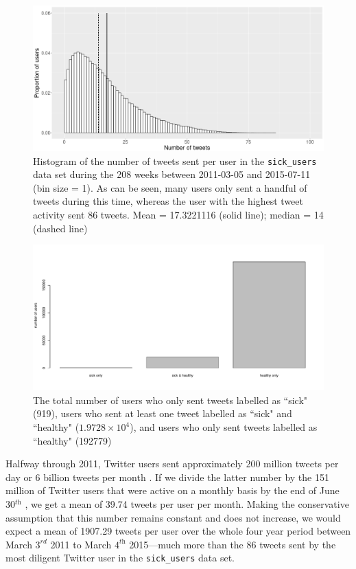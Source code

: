 \documentclass[11pt, a4paper,twoside]{report}\usepackage[]{graphicx}\usepackage[]{color}
\begin{document}
\begin{figure}[H]
  \centering
    \includegraphics[width=1\textwidth]{user_activity_total_sick_raw_df.png}
  \caption{Histogram of the number of tweets sent per user in the \texttt{sick\_users} data set during the 208 weeks between 2011-03-05 and 2015-07-11 (bin size = 1). As can be seen, many users only sent a handful of tweets during this time, whereas the user with the highest tweet activity sent 86 tweets. Mean = 17.3221116 (solid line); median = 14 (dashed line)}
  \label{fig:histogram_ID_tot}
\end{figure}

\hfill

\begin{figure}[H]
\centering
\includegraphics[width=1\linewidth]{barplot_sick_raw_df.pdf}
\caption{The total number of users who only sent tweets labelled as ``sick" (919), users who sent at least one tweet labelled as ``sick" and ``healthy" (\ensuremath{1.9728\times 10^{4}}), and users who only sent tweets labelled as ``healthy" (192779)}
\label{fig:barplot_sick_df}
\end{figure}

Halfway through 2011, Twitter users sent approximately 200 million tweets per day or 6 billion tweets per month \citep{twitter_million_2011}. If we divide the latter number by the 151 million of Twitter users that were active on a monthly basis by the end of June 30$^\textit{th}$ \citep{twitter_annual_2013}, we get a mean of 39.74 tweets per user per month. Making the conservative assumption that this number remains constant and does not increase, we would expect a mean of 1907.29 tweets per user over the whole four year period between March $3^\textit{rd}$ 2011 to March $4^\textit{th}$ 2015---much more than the 86 tweets sent by the most diligent Twitter user in the \texttt{sick\_users} data set.
\end{document}
